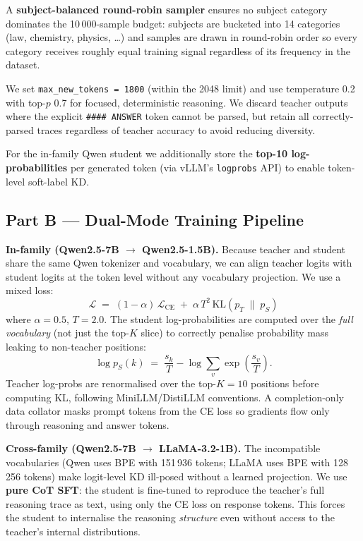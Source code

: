 \documentclass[11pt,a4paper]{article}
\begin{document}
A \textbf{subject-balanced round-robin sampler} ensures no subject category dominates the
10\,000-sample budget: subjects are bucketed into 14 categories (law, chemistry, physics,
\ldots) and samples are drawn in round-robin order so every category receives roughly equal
training signal regardless of its frequency in the dataset.

We set \texttt{max\_new\_tokens = 1800} (within the 2048 limit) and use temperature 0.2 with
top-$p$ 0.7 for focused, deterministic reasoning.  We discard teacher outputs where the
explicit \texttt{\#\#\#\# ANSWER} token cannot be parsed, but retain all correctly-parsed
traces regardless of teacher accuracy to avoid reducing diversity.

For the in-family Qwen student we additionally store the \textbf{top-10 log-probabilities}
per generated token (via vLLM's \texttt{logprobs} API) to enable token-level soft-label KD.

\subsection{Part B — Dual-Mode Training Pipeline}

\textbf{In-family (Qwen2.5-7B $\rightarrow$ Qwen2.5-1.5B).}\quad
Because teacher and student share the same Qwen tokenizer and vocabulary, we can align
teacher logits with student logits at the token level without any vocabulary projection.
We use a mixed loss:
\[
  \mathcal{L} \;=\; (1 - \alpha)\,\mathcal{L}_{\mathrm{CE}}
                   \;+\; \alpha\, T^2\,\mathrm{KL}(p_T \;\|\; p_S)
\]
where $\alpha=0.5$, $T=2.0$.  The student log-probabilities are computed over the
\emph{full vocabulary} (not just the top-$K$ slice) to correctly penalise probability mass
leaking to non-teacher positions:
\[
  \log p_S(k) \;=\; \frac{s_k}{T} - \log\sum_{v}\exp\!\left(\frac{s_v}{T}\right).
\]
Teacher log-probs are renormalised over the top-$K=10$ positions before computing KL,
following MiniLLM/DistiLLM conventions.  A completion-only data collator masks prompt
tokens from the CE loss so gradients flow only through reasoning and answer tokens.

\textbf{Cross-family (Qwen2.5-7B $\rightarrow$ LLaMA-3.2-1B).}\quad
The incompatible vocabularies (Qwen uses BPE with 151\,936 tokens; LLaMA uses BPE with
128\,256 tokens) make logit-level KD ill-posed without a learned projection.  We use
\textbf{pure CoT SFT}: the student is fine-tuned to reproduce the teacher's full
reasoning trace as text, using only the CE loss on response tokens.  This forces the student
to internalise the reasoning \emph{structure} even without access to the teacher's internal
distributions.
\end{document}
